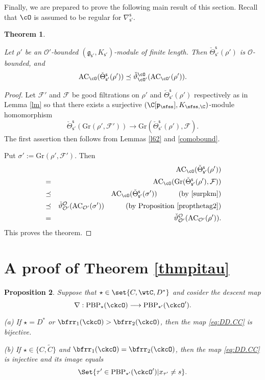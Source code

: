 \documentclass[12pt,a4paper]{amsart}
\newcommand{\CF}{{\mathcal {F}}}
\newcommand{\CO}{{\mathcal {O}}}
\newcommand{\g}{\mathfrak g}
\newcommand{\p}{\mathfrak p}
\def\DD{\nabla}
\newcommand{\be}{\begin {equation}}
\newcommand{\ee}{\end {equation}}
\numberwithin{equation}{section}
\newtheorem{thm}{Theorem}[section]
\newtheorem{prop}[thm]{Proposition}
\theoremstyle{remark}
\def\ckcOp{\ckcO^{\prime}}
\def\PBP{\mathrm{PBP}}
\begin{document}
Finally, we are prepared to prove the following main result of this section. Recall that  $\cO$ is assumed to be  regular  for $\DD_{\mathsf s'}^{\mathsf s}$.
\begin{thm}\label{prop:GDS.AC}
  
  Let $\rho'$ be an $\CO'$-bounded $(\g_{\mathsf s'}, K_{\mathsf s'})$-module of finite length. Then  $\check \Theta_{\mathsf s'}^{\mathsf s}(\rho')$ is $\CO$-bounded, and
    \[
    \mathrm{AC}_{\cO}(\check \Theta_{\mathsf s'}^{\mathsf s}(\rho'))\preceq \check \vartheta_{\cO'}^\cO(\mathrm{AC}_{\cO'}(\rho')).
  \]
\end{thm}
\begin{proof}
Let $\CF'$ and $\CF$ be  good filtrations  on $\rho'$ and  $\check \Theta_{\mathsf s'}^{\mathsf s}(\rho')$ respectively as in Lemma \ref{lm} so that there exists a 
 surjective $(\C[\p_{\sfss}], K_{\sfss, \C})$-module homomorphism
\be\label{surpkm}
  \check \Theta_{\mathsf s'}^{\mathsf s}(\mathrm{Gr}(\rho',\CF')) \rightarrow \mathrm{Gr}(\check \Theta_{\mathsf s'}^{\mathsf s}(\rho'),\CF).
\ee
The first assertion then follows from Lemmas \ref{l62} and \ref{comobound}. 

Put $\sigma':=\mathrm{Gr}(\rho',\CF')$. 
Then
\begin{eqnarray*}
      && \mathrm{AC}_{\cO}(\check \Theta_{\mathsf s'}^{\mathsf s}(\rho'))\\
      &=&  \mathrm{AC}_{\cO}(\mathrm{Gr}(\check \Theta_{\mathsf s'}^{\mathsf s}(\rho'),\CF))\\
             &\preceq& \mathrm{AC}_{\cO}(\check \Theta_{\mathsf s'}^{\mathsf s}(\sigma')) \quad \qquad (\textrm{by \eqref{surpkm}})\\
          &  \preceq & \check \vartheta_{\CO'}^{\CO}(\mathrm{AC}_{\CO'}(\sigma'))\quad \qquad (\textrm{by Proposition \ref{propthetag2}})\\ 
               &=&\check \vartheta_{\CO'}^{\CO}(\mathrm{AC}_{\CO'}(\rho')).
               \end{eqnarray*}
This proves the theorem. 
\end{proof}




\section{A proof of Theorem \ref{thmpitau} }

\begin{prop}\label{lem:DD.bij}
Suppose that $\star \in \set{C,\wtC,D^*}$ and cosider the
descent map
\begin{equation}\label{eq:DD.CC}
\nabla: \PBP_\star(\ckcO)\longrightarrow  \PBP_{\star'}(\ckcOp).
\end{equation}

\noindent (a) If
$\star=D^*$ or $\bfrr_1(\ckcO)>\bfrr_2(\ckcO)$, then
the map \eqref{eq:DD.CC}  is bijective.

 \noindent (b) If  $\star\in \{C,\widetilde C\}$ and $\bfrr_1(\ckcO)=\bfrr_2(\ckcO)$, then the  map \eqref{eq:DD.CC} is injective and its image equals
\[
\Set{\tau'\in \PBP_{\star'}(\ckcOp)| x_{\tau'}\neq s}.
\]

\end{prop}
\end{document}
